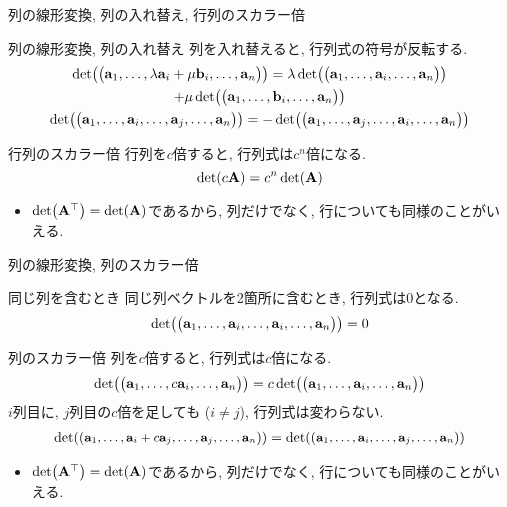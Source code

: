\documentclass[dvipdfmx,notheorems,t]{beamer}
\begin{document}
\begin{frame}{列の線形変換, 列の入れ替え, 行列のスカラー倍}
\begin{block}{列の線形変換, 列の入れ替え}
  列を入れ替えると, 行列式の符号が反転する.
  \begin{gather*}
    \det(\mqty(\vb{a}_1, \ldots, \lambda \vb{a}_i + \mu \vb{b}_i, \ldots, \vb{a}_n))
      = \lambda \det(\mqty(\vb{a}_1, \ldots, \vb{a}_i, \ldots, \vb{a}_n)) \\
        + \mu \det(\mqty(\vb{a}_1, \ldots, \vb{b}_i, \ldots, \vb{a}_n)) \\
    \det(\mqty(\vb{a}_1, \ldots, \vb{a}_i, \ldots, \vb{a}_j, \ldots, \vb{a}_n))
      = -\det(\mqty(\vb{a}_1, \ldots, \vb{a}_j, \ldots, \vb{a}_i, \ldots, \vb{a}_n))
  \end{gather*}
\end{block}

\begin{block}{行列のスカラー倍}
  行列を$c$倍すると, 行列式は$c^n$倍になる.
  $$\det(c \vb{A}) = c^n \det(\vb{A})$$
\end{block}

\begin{itemize}
  \item $\det(\vb{A}^\top) = \det(\vb{A})$であるから, 列だけでなく, 行についても同様のことがいえる.
\end{itemize}
\end{frame}

\begin{frame}{列の線形変換, 列のスカラー倍}
\begin{block}{同じ列を含むとき}
  同じ列ベクトルを2箇所に含むとき, 行列式は$0$となる.
  $$\det(\mqty(\vb{a}_1, \ldots, \vb{a}_i, \ldots, \vb{a}_i, \ldots, \vb{a}_n)) = 0$$
\end{block}

\begin{block}{列のスカラー倍}
  列を$c$倍すると, 行列式は$c$倍になる.
  $$\det(\mqty(\vb{a}_1, \ldots, c \vb{a}_i, \ldots, \vb{a}_n))
    = c \det(\mqty(\vb{a}_1, \ldots, \vb{a}_i, \ldots, \vb{a}_n))$$
  $i$列目に, $j$列目の$c$倍を足しても ($i \neq j$), 行列式は変わらない.
  \begin{align*}
    \small
    \det(\mqty(\vb{a}_1, \ldots, \vb{a}_i + c \vb{a}_j, \ldots, \vb{a}_j, \ldots, \vb{a}_n))
      = \det(\mqty(\vb{a}_1, \ldots, \vb{a}_i, \ldots, \vb{a}_j, \ldots, \vb{a}_n))
  \end{align*}
\end{block}

\begin{itemize}
  \item $\det(\vb{A}^\top) = \det(\vb{A})$であるから, 列だけでなく, 行についても同様のことがいえる.
\end{itemize}
\end{frame}
\end{document}
